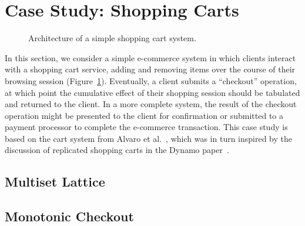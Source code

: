 \section{Case Study: Shopping Carts}
\label{sec:carts}

\begin{figure}
\label{fig:cart-system}
\caption{Architecture of a simple shopping cart system.}
\end{figure}

In this section, we consider a simple e-commerce system in which clients
interact with a shopping cart service, adding and removing items over the course
of their browsing session (Figure~\ref{fig:cart-system}). Eventually, a client
submits a ``checkout'' operation, at which point the cumulative effect of their
shopping session should be tabulated and returned to the client. In a more
complete system, the result of the checkout operation might be presented to the
client for confirmation or submitted to a payment processor to complete the
e-commerce transaction. This case study is based on the cart system from Alvaro
et al.~\cite{Alvaro2011}, which was in turn inspired by the discussion of
replicated shopping carts in the Dynamo paper~\cite{DeCandia2007}.

\subsection{Multiset Lattice}

\subsection{Monotonic Checkout}
